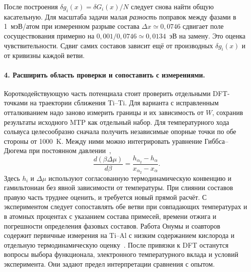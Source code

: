 После построения \(\delta g_i(x)=\delta G_i(x)/N\) следует снова найти
общую касательную. Для масштаба задачи малая \emph{разность} поправок
между фазами в 1~мэВ/атом при измеренном разрыве состава
\(\Delta x\simeq0{,}0746\) сдвигает поле сосуществования примерно на
\(0{,}001/0{,}0746\simeq0{,}0134\)~эВ на замену. Это оценка
чувствительности. Сдвиг самих составов зависит ещё от производных
\(\delta g_i(x)\) и от кривизны каждой ветви.

\paragraph{4. Расширить область проверки и сопоставить с измерениями.}
Короткодействующую часть потенциала стоит проверить отдельными DFT-точками
на траектории сближения Ti--Ti. Для варианта с исправленным отталкиванием
надо заново измерить границы и их зависимость от \(W\), сохранив результаты
исходного MTP как отдельный набор. Для температурного хода сольвуса
целесообразно сначала получить независимые опорные точки по обе стороны
от 1000~K. Между ними можно интегрировать уравнение Гиббса--Дюгема
при постоянном давлении~\cite{nam2007},
\[
 \frac{d(\beta\Delta\mu)}{d\beta}
     =\frac{h_{\alpha_2}-h_\alpha}{x_{\alpha_2}-x_\alpha}.
\]
Здесь \(h_i\) и \(\Delta\mu\) используют согласованную термодинамическую
конвенцию и гамильтониан без явной зависимости от температуры. При слиянии
составов правую часть труднее оценить, и требуется новый прямой расчёт.
С экспериментом следует сопоставлять обе ветви при совпадающих температурах
и в атомных процентах с указанием состава примесей, времени отжига и
погрешности определения фазовых составов. Работа Онумы и соавторов
содержит первичные измерения на Ti--Al с низким содержанием кислорода и
отдельную термодинамическую оценку~\cite{ohnuma2000}. После привязки к DFT
останутся вопросы выбора функционала, электронного температурного вклада
и условий эксперимента. Они задают предел интерпретации сравнения с опытом.
